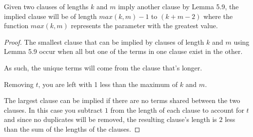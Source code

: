 \documentclass[manuscript]{acmart}
\begin{document}
    \begin{lemma}
        Given two clauses of lengths $k$ and $m$ imply another clause by Lemma 5.9, the implied clause will be of length $max(k, m)-1$ to $(k + m - 2)$ where the function $max(k, m)$ represents the parameter with the greatest value.
    \end{lemma}
    \begin{proof}
        The smallest clause that can be implied by clauses of length $k$ and $m$ using Lemma 5.9 occur when all but one of the terms in one clause exist in the other.

        As such, the unique terms will come from the clause that's longer.

        Removing $t$, you are left with 1 less than the maximum of $k$ and $m$.

        The largest clause can be implied if there are no terms shared between the two clauses. In this case you subtract $1$ from the length of each clause to account for $t$ and since no duplicates will be removed, the resulting clause's length is $2$ less than the sum of the lengths of 
        the clauses.
    \end{proof}
\end{document}
